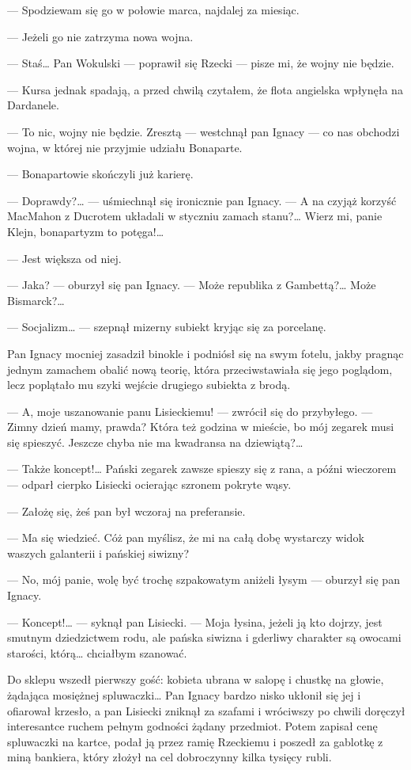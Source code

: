 \documentclass{book}
\begin{document}
— Spodziewam się go w połowie marca, najdalej za miesiąc.

— Jeżeli go nie zatrzyma nowa wojna.

— Staś… Pan Wokulski — poprawił się Rzecki — pisze mi, że wojny nie będzie.

— Kursa jednak spadają, a przed chwilą czytałem, że flota angielska wpłynęła na Dardanele.

— To nic, wojny nie będzie. Zresztą — westchnął pan Ignacy — co nas obchodzi wojna, w której nie przyjmie udziału Bonaparte.

— Bonapartowie skończyli już karierę.

— Doprawdy?… — uśmiechnął się ironicznie pan Ignacy. — A na czyjąż korzyść MacMahon z Ducrotem układali w styczniu zamach stanu?… Wierz mi, panie Klejn, bonapartyzm to potęga!…

— Jest większa od niej.

— Jaka? — oburzył się pan Ignacy. — Może republika z Gambettą?… Może Bismarck?…

— Socjalizm… — szepnął mizerny subiekt kryjąc się za porcelanę.

Pan Ignacy mocniej zasadził binokle i podniósł się na swym fotelu, jakby pragnąc jednym zamachem obalić nową teorię, która przeciwstawiała się jego poglądom, lecz poplątało mu szyki wejście drugiego subiekta z brodą.

— A, moje uszanowanie panu Lisieckiemu! — zwrócił się do przybyłego. — Zimny dzień mamy, prawda? Która też godzina w mieście, bo mój zegarek musi się spieszyć. Jeszcze chyba nie ma kwadransa na dziewiątą?…

— Także koncept!… Pański zegarek zawsze spieszy się z rana, a późni wieczorem — odparł cierpko Lisiecki ocierając szronem pokryte wąsy.

— Założę się, żeś pan był wczoraj na preferansie.

— Ma się wiedzieć. Cóż pan myślisz, że mi na całą dobę wystarczy widok waszych galanterii i pańskiej siwizny?

— No, mój panie, wolę być trochę szpakowatym aniżeli łysym — oburzył się pan Ignacy.

— Koncept!… — syknął pan Lisiecki. — Moja łysina, jeżeli ją kto dojrzy, jest smutnym dziedzictwem rodu, ale pańska siwizna i gderliwy charakter są owocami starości, którą… chciałbym szanować.

Do sklepu wszedł pierwszy gość: kobieta ubrana w salopę i chustkę na głowie, żądająca mosiężnej spluwaczki… Pan Ignacy bardzo nisko ukłonił się jej i ofiarował krzesło, a pan Lisiecki zniknął za szafami i wróciwszy po chwili doręczył interesantce ruchem pełnym godności żądany przedmiot. Potem zapisał cenę spluwaczki na kartce, podał ją przez ramię Rzeckiemu i poszedł za gablotkę z miną bankiera, który złożył na cel dobroczynny kilka tysięcy rubli.
\end{document}
